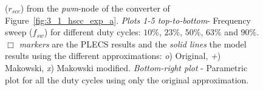 \begin{figure}[!h]
\centering
    \begin{subfigure}{0.45\textwidth}
        
    \end{subfigure}
    \hfill
    \begin{subfigure}{0.45\textwidth}
        
    \end{subfigure}

    \begin{subfigure}{0.45\textwidth}
        
    \end{subfigure}
    \hfill
    \begin{subfigure}{0.45\textwidth}
        
    \end{subfigure}

        \begin{subfigure}{0.45\textwidth}
        
    \end{subfigure}
    \hfill
    \begin{subfigure}{0.45\textwidth}
        
    \end{subfigure}

\caption{ ($r_{scc}$) from the \emph{pwm}-node of the converter of Figure~\ref{fig:3_1_hscc_exp_a}. \emph{Plots 1-5 top-to-bottom}- Frequency sweep ($f_{sw}$) for different duty cycles: $10\%$, $23\%$, $50\%$, $63\%$ and $90\%$. \emph{$\Box$ markers} are the PLECS results and the \emph{solid lines} the model results using the different approximations: \emph{o}) Original, \emph{+}) Makowski, \emph{x})  Makowski modified. \emph{Bottom-right plot} - Parametric plot for all the duty cycles using only the original approximation. }\label{fig:exp_rscc_pwm_node_fsw}
\end{figure}

\clearpage
